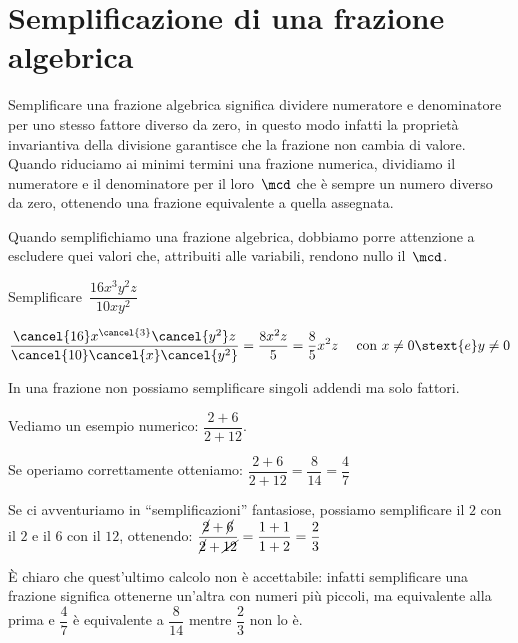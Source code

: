 \section{Semplificazione di una frazione 
algebrica}
\label{sec:frazalg_semplificazione}

Semplificare una frazione algebrica significa dividere numeratore e 
denominatore per uno stesso fattore diverso da zero, in questo modo 
infatti la proprietà invariantiva della divisione garantisce che la 
frazione non cambia di valore.
Quando riduciamo ai minimi termini una frazione numerica, dividiamo il 
numeratore e il denominatore per il loro~\(\mcd\) che è sempre un numero
diverso da zero, ottenendo una frazione equivalente a quella assegnata.

Quando semplifichiamo una frazione algebrica, dobbiamo 
porre attenzione a escludere quei valori che, attribuiti alle variabili, 
rendono nullo il~\(\mcd\).

\begin{esempio}{}{}
Semplificare~\(\dfrac{16x^{3}y^{2}z}{10xy^{2}}\)

\vspace{-.5em}
\[%
\dfrac{\cancel{16}x^{\cancel{3}}\cancel{y^{2}}z}
      {\cancel{10}\cancel{x}\cancel{y^{2}}}=
\dfrac{8x^{2}z}{5}=\dfrac{8}{5}x^{2}z
\quad \text{ con } x \ne 0 \stext{e} y \ne 0
\]
\end{esempio}

\begin{osservazione}{}{} 
In una frazione non possiamo semplificare singoli 
addendi ma solo fattori.
\end{osservazione}

Vediamo un esempio numerico: \quad \(\dfrac{2+6}{2+12}\). 

Se operiamo correttamente otteniamo: \quad
\(\dfrac{2+6}{2+12}=\dfrac{8}{14}=\dfrac{4}{7}\)

Se ci avventuriamo in ``semplificazioni'' fantasiose, possiamo 
semplificare il \(2\) con il \(2\) e il \(6\) con il 
\(12\), ottenendo: \quad
\(\dfrac{\cancel{2} +\cancel{6}}{\cancel{2} +\cancel{12}}=
\dfrac{1+1}{1+2}=\dfrac{2}{3}\)

È chiaro che quest'ultimo calcolo non è accettabile: infatti 
semplificare una frazione significa ottenerne un'altra con numeri più 
piccoli, ma equivalente alla prima e \(\dfrac{4}{7}\) è equivalente a 
\(\dfrac{8}{14}\) mentre \(\dfrac{2}{3}\) non lo è.

